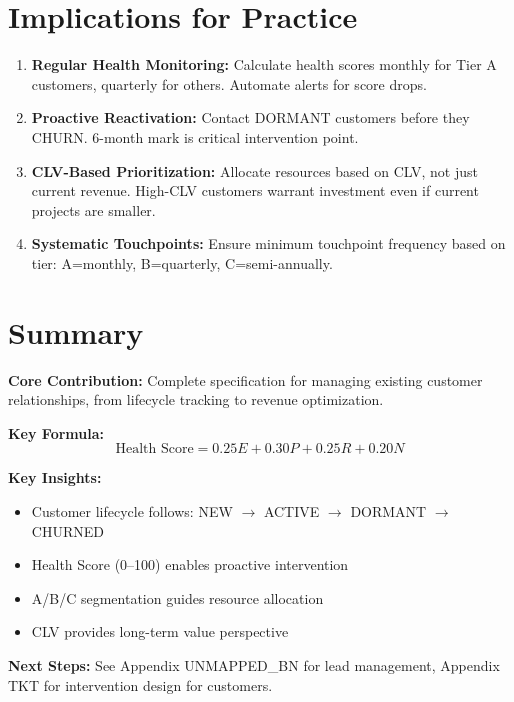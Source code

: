 \section{Implications for Practice}
\label{sec:bp-practice}

\begin{tcolorbox}[colback=green!5!white, colframe=green!75!black,
    title=Practical Implications]
\begin{enumerate}
\item \textbf{Regular Health Monitoring:} Calculate health scores monthly for
      Tier A customers, quarterly for others. Automate alerts for score drops.
\item \textbf{Proactive Reactivation:} Contact DORMANT customers before they
      CHURN. 6-month mark is critical intervention point.
\item \textbf{CLV-Based Prioritization:} Allocate resources based on CLV, not
      just current revenue. High-CLV customers warrant investment even if
      current projects are smaller.
\item \textbf{Systematic Touchpoints:} Ensure minimum touchpoint frequency
      based on tier: A=monthly, B=quarterly, C=semi-annually.
\end{enumerate}
\end{tcolorbox}


\section{Summary}
\label{sec:bp-summary}

\begin{tcolorbox}[colback=gray!5!white, colframe=gray!75!black,
    title=Appendix BP Summary: Customer Management System]

\textbf{Core Contribution:}
Complete specification for managing existing customer relationships, from
lifecycle tracking to revenue optimization.

\textbf{Key Formula:}
\begin{equation}
\text{Health Score} = 0.25E + 0.30P + 0.25R + 0.20N
\end{equation}

\textbf{Key Insights:}
\begin{itemize}[nosep]
\item Customer lifecycle follows: NEW $\rightarrow$ ACTIVE $\rightarrow$ DORMANT $\rightarrow$ CHURNED
\item Health Score (0--100) enables proactive intervention
\item A/B/C segmentation guides resource allocation
\item CLV provides long-term value perspective
\end{itemize}

\textbf{Next Steps:} See Appendix UNMAPPED_BN for lead management, Appendix TKT for
intervention design for customers.
\end{tcolorbox}


